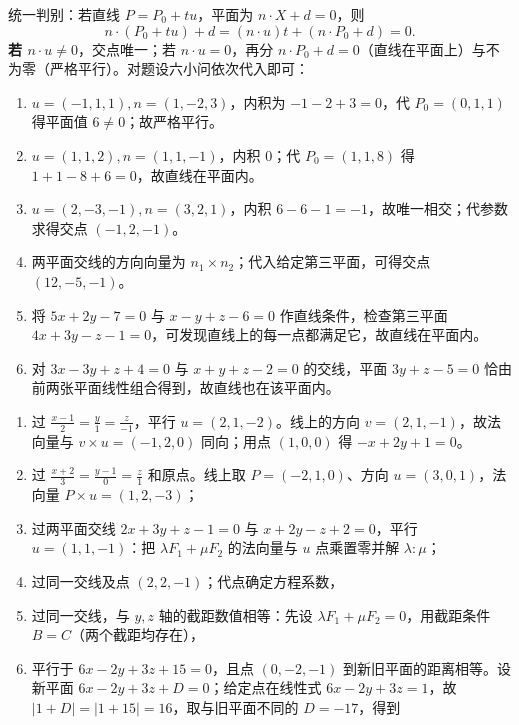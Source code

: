统一判别：若直线 $P=P_0+tu$，平面为 $n\cdot X+d=0$，则
\[
n\cdot(P_0+tu)+d=(n\cdot u)t+(n\cdot P_0+d)=0.
\]
\textbf{若 $n\cdot u\ne0$}，交点唯一；若 $n\cdot u=0$，再分 $n\cdot P_0+d=0$（直线在平面上）与不为零（严格平行）。对题设六小问依次代入即可：
\begin{enumerate}[label=(\arabic*)]
\item $u=(-1,1,1),n=(1,-2,3)$，内积为 $-1-2+3=0$，代 $P_0=(0,1,1)$ 得平面值 $6\ne0$；故严格平行。
\item $u=(1,1,2),n=(1,1,-1)$，内积 $0$；代 $P_0=(1,1,8)$ 得 $1+1-8+6=0$，故直线在平面内。
\item $u=(2,-3,-1),n=(3,2,1)$，内积 $6-6-1=-1$，故唯一相交；代参数求得交点 $(-1,2,-1)$。
\item 两平面交线的方向向量为 $n_1\times n_2$；代入给定第三平面，可得交点 $(12,-5,-1)$。
\item 将 $5x+2y-7=0$ 与 $x-y+z-6=0$ 作直线条件，检查第三平面 $4x+3y-z-1=0$，可发现直线上的每一点都满足它，故直线在平面内。
\item 对 $3x-3y+z+4=0$ 与 $x+y+z-2=0$ 的交线，平面 $3y+z-5=0$ 恰由前两张平面线性组合得到，故直线也在该平面内。
\end{enumerate}

\begin{enumerate}[label=(\arabic*)]
\item 过 $\frac{x-1}{2}=\frac y1=\frac z{-1}$，平行 $u=(2,1,-2)$。线上的方向 $v=(2,1,-1)$，故法向量与 $v\times u=(-1,2,0)$ 同向；用点 $(1,0,0)$ 得 $-x+2y+1=0$。
\item 过 $\frac{x+2}3=\frac{y-1}0=\frac z1$ 和原点。线上取 $P=(-2,1,0)$、方向 $u=(3,0,1)$，法向量 $P\times u=(1,2,-3)$；
\item 过两平面交线 $2x+3y+z-1=0$ 与 $x+2y-z+2=0$，平行 $u=(1,1,-1)$：把 $\lambda F_1+\mu F_2$ 的法向量与 $u$ 点乘置零并解 $\lambda:\mu$；
\item 过同一交线及点 $(2,2,-1)$；代点确定方程系数，
\item 过同一交线，与 $y,z$ 轴的截距数值相等：先设 $\lambda F_1+\mu F_2=0$，用截距条件 $B=C$（两个截距均存在），
\item 平行于 $6x-2y+3z+15=0$，且点 $(0,-2,-1)$ 到新旧平面的距离相等。设新平面 $6x-2y+3z+D=0$；给定点在线性式 $6x-2y+3z=1$，故 $|1+D|=|1+15|=16$，取与旧平面不同的 $D=-17$，得到
\end{enumerate}

